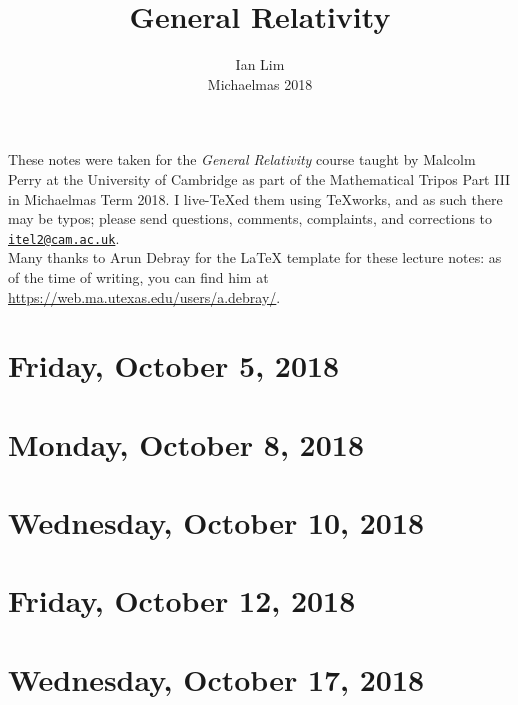 \documentclass[reqno]{amsart}
\begin{document}
\title{General Relativity}
\author{Ian Lim\\ Michaelmas 2018}
\maketitle
{\small\noindent These notes were taken for the \textit{General Relativity} course taught by Malcolm Perry at the University of Cambridge as part of the Mathematical Tripos Part III in Michaelmas Term 2018. I live-\TeX ed them using TeXworks, and as such there may be typos; please send questions, comments, complaints, and corrections to 
\href{mailto:itel2@cam.ac.uk?subject=GR\%20Lecture\%20Notes}{\texttt{itel2@cam.ac.uk}}.\\
Many thanks to Arun Debray for the {\LaTeX} template for these lecture notes: as of the time of writing, you can find him at \url{https://web.ma.utexas.edu/users/a.debray/}.}

\tableofcontents

\section{Friday, October 5, 2018}
	

\section{Monday, October 8, 2018}
	

\section{Wednesday, October 10, 2018}
	

\section{Friday, October 12, 2018}
	

\section{Wednesday, October 17, 2018}
    
\end{document}
